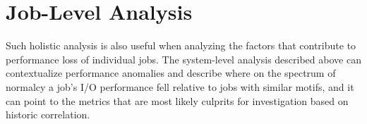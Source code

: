 
\section{Job-Level Analysis} \label{sec:results/umami}

Such holistic analysis is also useful when analyzing the factors that contribute to performance loss of individual jobs.
The system-level analysis described above can contextualize performance anomalies and describe where on the spectrum of normalcy a job's I/O performance fell relative to jobs with similar motifs, and it can point to the metrics that are most likely culprits for investigation based on historic correlation.

